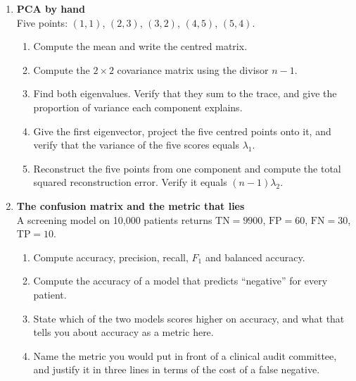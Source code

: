 \documentclass[11pt,a4paper]{article}
\begin{document}
\begin{enumerate}[label=\textbf{B\arabic*.}, leftmargin=*]
  \item \textbf{PCA by hand} \\
    Five points: $(1,1)$, $(2,3)$, $(3,2)$, $(4,5)$, $(5,4)$.
    \begin{enumerate}[label=(\alph*), leftmargin=*]
      \item Compute the mean and write the centred matrix. 
      \item Compute the $2\times2$ covariance matrix using the divisor $n-1$.
      \item Find both eigenvalues. Verify that they sum to the trace, and give
        the proportion of variance each component explains. 
      \item Give the first eigenvector, project the five centred points onto
        it, and verify that the variance of the five scores equals
        $\lambda_1$. 
      \item Reconstruct the five points from one component and compute the
        total squared reconstruction error. Verify it equals
        $(n-1)\lambda_2$. 
    \end{enumerate}

  \item \textbf{The confusion matrix and the metric that lies} \\
    A screening model on 10{,}000 patients returns $\text{TN} = 9900$,
    $\text{FP} = 60$, $\text{FN} = 30$, $\text{TP} = 10$.
    \begin{enumerate}[label=(\alph*), leftmargin=*]
      \item Compute accuracy, precision, recall, $F_1$ and balanced accuracy.
      \item Compute the accuracy of a model that predicts ``negative'' for
        every patient. 
      \item State which of the two models scores higher on accuracy, and what
        that tells you about accuracy as a metric here. 
      \item Name the metric you would put in front of a clinical audit
        committee, and justify it in three lines in terms of the cost of a
        false negative. 
    \end{enumerate}


\end{enumerate}
\end{document}
